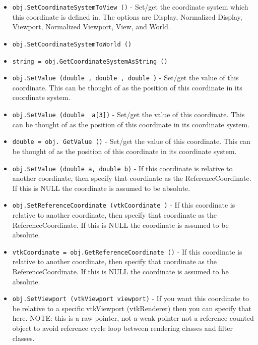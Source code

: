 \begin{itemize}
\item  \verb|obj.SetCoordinateSystemToView ()| -  Set/get the coordinate system which this coordinate
 is defined in. The options are Display, Normalized Display,
 Viewport, Normalized Viewport, View, and World.

\item  \verb|obj.SetCoordinateSystemToWorld ()|

\item  \verb|string = obj.GetCoordinateSystemAsString ()|

\item  \verb|obj.SetValue (double , double , double )| -  Set/get the value of this coordinate. This can be thought of as
 the position of this coordinate in its coordinate system.

\item  \verb|obj.SetValue (double  a[3])| -  Set/get the value of this coordinate. This can be thought of as
 the position of this coordinate in its coordinate system.

\item  \verb|double = obj. GetValue ()| -  Set/get the value of this coordinate. This can be thought of as
 the position of this coordinate in its coordinate system.

\item  \verb|obj.SetValue (double a, double b)| -  If this coordinate is relative to another coordinate,
 then specify that coordinate as the ReferenceCoordinate.
 If this is NULL the coordinate is assumed to be absolute.

\item  \verb|obj.SetReferenceCoordinate (vtkCoordinate )| -  If this coordinate is relative to another coordinate,
 then specify that coordinate as the ReferenceCoordinate.
 If this is NULL the coordinate is assumed to be absolute.

\item  \verb|vtkCoordinate = obj.GetReferenceCoordinate ()| -  If this coordinate is relative to another coordinate,
 then specify that coordinate as the ReferenceCoordinate.
 If this is NULL the coordinate is assumed to be absolute.

\item  \verb|obj.SetViewport (vtkViewport viewport)| -  If you want this coordinate to be relative to a specific
 vtkViewport (vtkRenderer) then you can specify
 that here.
 NOTE: this is a raw pointer, not a weak pointer not a reference counted
 object to avoid reference cycle loop between rendering classes and filter
 classes.


\end{itemize}
